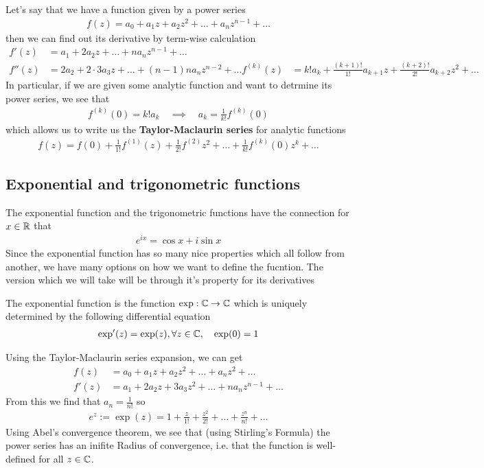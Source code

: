 Let's say that we have a function given by a power series
\begin{align*}
	f(z) = a_0 + a_1 z + a_2 z^2 + \ldots + a_nz^{n-1} + \ldots
\end{align*}
then we can find out its derivative by term-wise calculation
\begin{align*}
	f'(z) &= a_1 + 2a_2z + \ldots + n a_n z^{n-1} + \ldots\\
	f''(z) &= 2a_2 + 2 \cdot 3 a_3 z + \ldots +(n-1)n a_n z^{n-2} + \ldots
	f^{(k)}(z) &= k!a_k + \frac{(k+1)!}{1!}a_{k+1}z + \frac{(k+2)!}{2!}a_{k+2}z^2 +  \ldots  
\end{align*}
In particular, if we are given some analytic function and want to detrmine its power series, we see that
\begin{align*}
	f^{(k)}(0) = k!a_k \quad\implies \quad a_k = \frac{1}{k!}f^{(k)}(0)
\end{align*}
which allows us to write us the \textbf{Taylor-Maclaurin series} for analytic functions
\begin{align*}
	f(z) = f(0) + \frac{1}{1!}f^{(1)}(z) + \frac{1}{2!}f^{(2)}z^2 + \ldots + \frac{1}{k!}f^{(k)}(0)z^k + \ldots
\end{align*}

\subsection{Exponential and trigonometric functions}
The exponential function and the trigonometric functions have the connection for $x \in \mathbb{R}$ that
\begin{align*}
	e^{ix} = \cos x + i \sin x
\end{align*}
Since the exponential function has so many nice properties which all follow from another, we have many options on how we want to define the fucntion. The version which we will take will be through it's property for its derivatives

\begin{definition}
The exponential function is the function $\exp: \mathbb{C} \to \mathbb{C}$ which is uniquely determined by the following differential equation
\begin{align*}
	\exp'(z) = \exp(z), \forall z \in \mathbb{C}, \quad \exp(0) = 1
\end{align*}
\end{definition}
Using the Taylor-Maclaurin series expansion, we can get
\begin{align*}
	f(z) &= a_0 + a_1 z + a_2z^2 + \ldots + a_nz^2 + \ldots\\
	f'(z) &= a_1 + 2a_2 z + 3a_3 z^2 + \ldots + na_n z^{n-1} + \ldots \end{align*}
From this we find that $a_n = \frac{1}{n!}$ so
\begin{align*}
	e^{z} := \exp(z) = 1 + \frac{z}{1!} + \frac{z^2}{2!} + \ldots + \frac{z^n}{n!} + \ldots
\end{align*}
Using Abel's convergence theorem, we see that (using Stirling's Formula) the power series has an inifite Radius of convergence, i.e. that the function is well-defined for all $z \in \mathbb{C}$.\\

